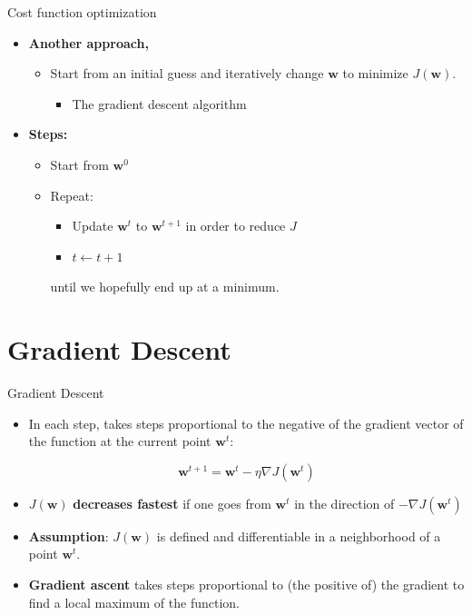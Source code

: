 \documentclass[serif, aspectratio=169]{beamer}
\begin{document}
\begin{frame}{Cost function optimization}

\begin{itemize}
    \item \textbf{Another approach,}
    \begin{itemize}
        \item Start from an initial guess and iteratively change \( \mathbf{w} \) to minimize \( J(\mathbf{w}) \).
        \begin{itemize}
            \item The gradient descent algorithm
        \end{itemize}
    \end{itemize}
    
    \item \textbf{Steps:}
    \begin{itemize}
        \item Start from \( \mathbf{w}^0 \)
        \item Repeat:
        \begin{itemize}
            \item Update \( \mathbf{w}^t \) to \( \mathbf{w}^{t+1} \) in order to reduce \( J \)
            \item \( t \leftarrow t + 1 \)
        \end{itemize}
        until we hopefully end up at a minimum.
    \end{itemize}
\end{itemize}

\end{frame}

\section{Gradient Descent}
\begin{frame}{Gradient Descent}

    \begin{itemize}
        \item In each step, takes steps proportional to the negative of the gradient vector of the function at the current point \( \mathbf{w}^t \):
        
        \[
        \mathbf{w}^{t+1} = \mathbf{w}^t - \eta \nabla J(\mathbf{w}^t)
        \]
        
        \item \( J(\mathbf{w}) \) \textbf{decreases fastest} if one goes from \( \mathbf{w}^t \) in the direction of \( -\nabla J(\mathbf{w}^t) \)
        
        \item \textbf{Assumption}: \( J(\mathbf{w}) \) is defined and differentiable in a neighborhood of a point \( \mathbf{w}^t \). 
        \item \textbf{Gradient ascent} takes steps proportional to (the positive of) the gradient to find a local maximum of the function.
        
    
    \end{itemize}

\end{frame}
\end{document}
